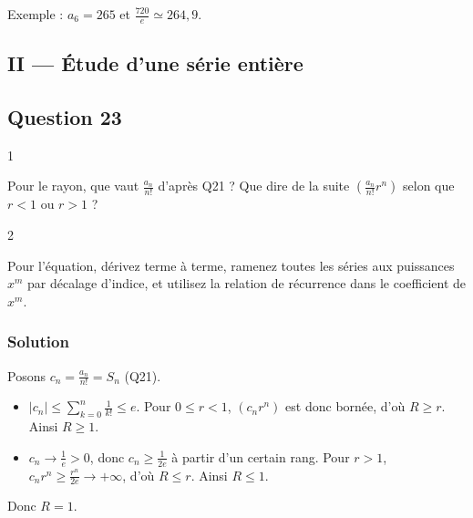 \documentclass[11pt,a4paper]{article}
\providecommand{\tightlist}{\setlength{\itemsep}{0pt}\setlength{\parskip}{0pt}}
\begin{document}
Exemple : \(a_6=265\) et \(\frac{720}e\simeq264{,}9\).

\hypertarget{ii-uxe9tude-dune-suxe9rie-entiuxe8re}{%
\subsection{II --- Étude d'une série entière}\label{ii-uxe9tude-dune-suxe9rie-entiuxe8re}}

\hypertarget{question-23}{%
\subsection{Question 23}\label{question-23}}

\begin{indication}{1}

Pour le rayon, que vaut \(\frac{a_n}{n!}\) d'après Q21 ? Que dire de la suite \(\left(\frac{a_n}{n!}r^n\right)\) selon que \(r<1\) ou \(r>1\) ?

\end{indication}

\begin{indication}{2}

Pour l'équation, dérivez terme à terme, ramenez toutes les séries aux puissances \(x^m\) par décalage d'indice, et utilisez la relation de récurrence dans le coefficient de \(x^m\).

\end{indication}

\hypertarget{solution-22}{%
\subsubsection{Solution}\label{solution-22}}

Posons \(c_n=\frac{a_n}{n!}=S_n\) (Q21).

\begin{itemize}
\tightlist
\item
  \(|c_n|\le\sum_{k=0}^{n}\frac1{k!}\le e\). Pour \(0\le r<1\), \((c_nr^n)\) est donc bornée, d'où \(R\ge r\). Ainsi \(R\ge1\).
\item
  \(c_n\to\frac1e>0\), donc \(c_n\ge\frac1{2e}\) à partir d'un certain rang. Pour \(r>1\), \(c_nr^n\ge\frac{r^n}{2e}\to+\infty\), d'où \(R\le r\). Ainsi \(R\le1\).
\end{itemize}

Donc \(\boxed{R=1}\).
\end{document}
